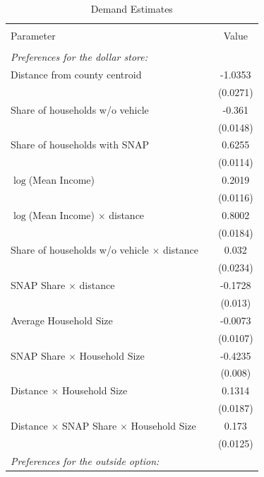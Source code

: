 
\begin{table}[!htbp] \centering 
  \caption{Demand Estimates} 
  \label{tab:demand} 
\begin{tabular}{@{\extracolsep{5pt}} lcc} 
\\[-1.8ex]\hline 
\hline \\[-1.8ex] 
Parameter &  & Value \\ 
\hline \\[-1.8ex] 
\textit{Preferences for the dollar store:}& & \\
\quad Distance from county centroid &  & -1.0353 \\ [-1.8ex] 
 &  & (0.0271) \\ 
\quad Share of households w/o vehicle  &  & -0.361 \\ [-1.8ex] 
 &  & (0.0148) \\ 
\quad Share of households with SNAP &  & 0.6255 \\ [-1.8ex] 
 &  & (0.0114) \\ 
\quad $\log$(Mean Income) &  & 0.2019 \\ [-1.8ex] 
 &  & (0.0116) \\ 
\quad $\log$(Mean Income) $\times$ distance &  & 0.8002 \\ [-1.8ex] 
 &  & (0.0184) \\ 
\quad Share of households w/o vehicle $\times$ distance  &  & 0.032 \\ [-1.8ex] 
 &  & (0.0234) \\ 
\quad  SNAP Share $\times$ distance  &  & -0.1728 \\ [-1.8ex] 
 &  & (0.013) \\ 
\quad Average Household Size &  & -0.0073 \\ [-1.8ex] 
 &  & (0.0107) \\ 
\quad  SNAP Share $\times$  Household Size &  & -0.4235 \\ [-1.8ex] 
 &  & (0.008) \\ 
\quad Distance $\times$  Household Size   &  & 0.1314 \\ [-1.8ex] 
 &  & (0.0187) \\ 
\quad Distance $\times$ SNAP Share $\times$ Household Size&  & 0.173 \\ [-1.8ex] 
 &  & (0.0125) \\ 
\textit{Preferences for the outside option:}& & \\

\end{tabular}
\end{table}
